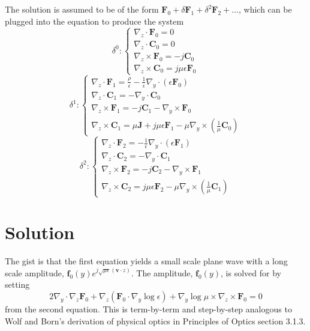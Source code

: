 \documentclass{article}
\theoremstyle{plain}
\begin{document}
The solution is assumed to be of the form $\mathbf{F}_0 + \delta \mathbf{F}_1 + \delta^2\mathbf{F}_2 + ...$, which can be plugged into the equation to produce the system
\begin{equation}
	\delta^0:
	\begin{cases}
		\nabla_z\cdot\mathbf{F}_0 = 0 \\
		\nabla_z\cdot\mathbf{C}_0 = 0 \\
		\nabla_z\times\mathbf{F}_0 = -j\mathbf{C}_0 \\
		\nabla_z\times\mathbf{C}_0 = j\mu\epsilon\mathbf{F}_0
	\end{cases}
\end{equation}
\begin{equation}
	\delta^1:
	\begin{cases}
		\nabla_z\cdot\mathbf{F}_1 = \frac{\rho}{\epsilon} - \frac{1}{\epsilon}\nabla_y\cdot\left(\epsilon\mathbf{F}_0\right)\\
		\nabla_z\cdot\mathbf{C}_1 = -\nabla_y\cdot\mathbf{C}_0 \\
		\nabla_z\times\mathbf{F}_1 = -j\mathbf{C}_1 - \nabla_y\times\mathbf{F}_0\\
		\nabla_z\times\mathbf{C}_1 = \mu\mathbf{J} + j\mu\epsilon\mathbf{F}_1 - \mu\nabla_y\times\left(\frac{1}{\mu}\mathbf{C}_0\right)
	\end{cases}
\end{equation}
\begin{equation}
	\delta^2:
	\begin{cases}
		\nabla_z\cdot\mathbf{F}_2 = -\frac{1}{\epsilon}\nabla_y\cdot\left(\epsilon\mathbf{F}_1\right)\\
		\nabla_z\cdot\mathbf{C}_2 = -\nabla_y\cdot\mathbf{C}_1 \\
		\nabla_z\times\mathbf{F}_2 = -j\mathbf{C}_2 - \nabla_y\times\mathbf{F}_1\\
		\nabla_z\times\mathbf{C}_2 = j\mu\epsilon\mathbf{F}_2 - \mu\nabla_y\times\left(\frac{1}{\mu}\mathbf{C}_1\right)
	\end{cases}
\end{equation}



\section{Solution}\label{sec:sol}

The gist is that the first equation yields a small scale plane wave with a long scale amplitude, $\mathbf{f}_0(y)e^{j\sqrt{\mu\epsilon}\left(\mathbf{v}\cdot z\right)}$. The amplitude, $\mathbf{f}_0(y)$, is solved for by setting
\begin{equation*}
	2\nabla_y\cdot\nabla_z\mathbf{F}_0 + \nabla_z\left( \mathbf{F}_0\cdot\nabla_y\log{\epsilon} \right) + \nabla_y\log{\mu}\times\nabla_z\times\mathbf{F}_0 = 0
\end{equation*}
from the second equation. This is term-by-term and step-by-step analogous to Wolf and Born's derivation of physical optics in Principles of Optics section 3.1.3.
\end{document}
